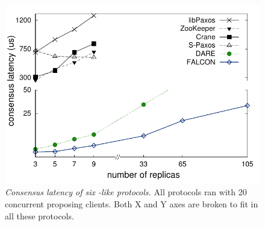 \begin{figure}[t]
\centering
\vspace{-.10in}
\includegraphics[width=.4\textwidth]{figures/traditional_paxos_latency}
\vspace{-.15in}
\caption{{\em Consensus latency of six \paxos-like protocols.} All protocols 
ran with 20 concurrent proposing clients. Both X and Y axes are broken to fit 
in all these protocols.}
\label{fig:scalability}
\vspace{-.20in}
\end{figure}
